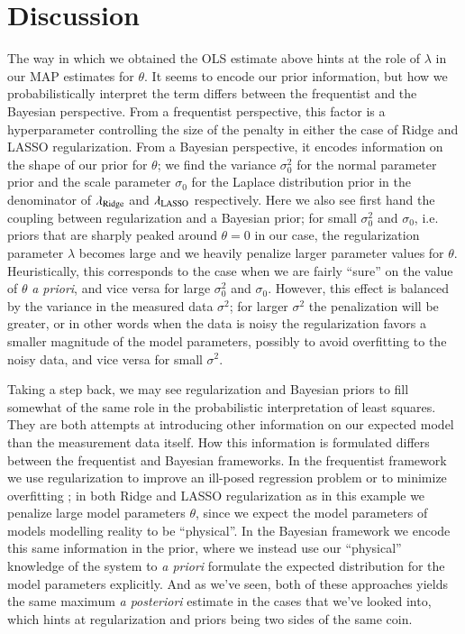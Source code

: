 \documentclass[11pt,a4paper]{article}
\begin{document}
\section{Discussion}

The way in which we obtained the OLS estimate above hints at the role of $\lambda$ in our MAP estimates for $\theta$. It seems to encode our prior information, but how we probabilistically interpret the term differs between the frequentist and the Bayesian perspective. From a frequentist perspective, this factor is a hyperparameter controlling the size of the penalty in either the case of Ridge and LASSO regularization. From a Bayesian perspective, it encodes information on the shape of our prior for $\theta$; we find the variance $\sigma_0^2$ for the normal parameter prior and the scale parameter $\sigma_0$ for the Laplace distribution prior in the denominator of $\lambda_{\rm Ridge}$ and $\lambda_{\rm LASSO}$ respectively. Here we also see first hand the coupling between regularization and a Bayesian prior; for small $\sigma_0^2$ and $\sigma_0$, i.e. priors that are sharply peaked around $\theta=0$ in our case, the regularization parameter $\lambda$ becomes large and we heavily penalize larger parameter values for $\theta$. Heuristically, this corresponds to the case when we are fairly ``sure'' on the value of $\theta$ \textit{a priori}, and vice versa for large $\sigma_0^2$ and $\sigma_0$. However, this effect is balanced by the variance in the measured data $\sigma^2$; for larger $\sigma^2$ the penalization will be greater, or in other words when the data is noisy the regularization favors a smaller magnitude of the model parameters, possibly to avoid overfitting to the noisy data, and vice versa for small $\sigma^2$.

Taking a step back, we may see regularization and Bayesian priors to fill somewhat of the same role \cite{tds} in the probabilistic interpretation of least squares. They are both attempts at introducing other information on our expected model than the measurement data itself. How this information is formulated differs between the frequentist and Bayesian frameworks. In the frequentist framework we use regularization to improve an ill-posed regression problem or to minimize overfitting \cite{wiki_reg}; in both Ridge and LASSO regularization as in this example we penalize large model parameters $\theta$, since we expect the model parameters of models modelling reality to be ``physical''. In the Bayesian framework we encode this same information in the prior, where we instead use our ``physical'' knowledge of the system to \textit{a priori} formulate the expected distribution for the model parameters explicitly. And as we've seen, both of these approaches yields the same maximum \textit{a posteriori} estimate in the cases that we've looked into, which hints at regularization and priors being two sides of the same coin.

\printbibliography
\end{document}
